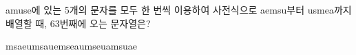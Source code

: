 amuse에 있는 5개의 문자를 모두 한 번씩 이용하여 사전식으로 aemsu부터 usmea까지 배열할 때, 63번째에 오는 문자열은?
\begin{choices32}{msaeu}{msaue}{mseau}{mseua}{msuae}\end{choices32}
